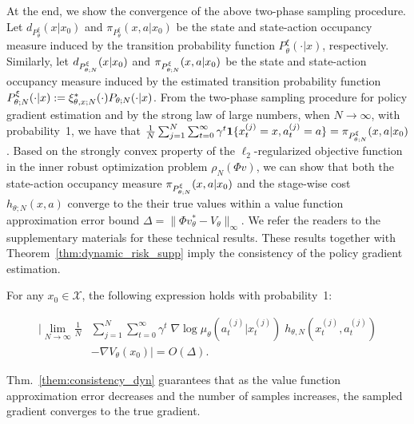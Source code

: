 At the end, we show the convergence of the above two-phase sampling procedure.
Let $d_{{P}^\xi_{\theta}}(x|x_0)$ and $\pi_{{P}^\xi_{\theta}}(x,a|x_0)$ be the state and state-action occupancy measure induced by the transition probability function $P^\xi_{\theta}(\cdot|x)$, respectively. Similarly, let $d_{P_{\theta;N}^\xi}(x|x_0)$ and $\pi_{P_{\theta;N}^\xi}(x,a|x_0)$ be the state and state-action occupancy measure induced by the estimated transition probability function $P_{\theta;N}^\xi(\cdot|x):=\xi_{\theta,x;N}^*(\cdot)P_{\theta;N}(\cdot|x)$. From the two-phase sampling procedure for policy gradient estimation and by the strong law of large numbers, when $N\rightarrow\infty$, with probability~1, we have that $\frac{1}{N}\sum_{j=1}^N\sum_{t=0}^\infty\gamma^t\mathbf 1\{x^{(j)}_t=x,a^{(j)}_t=a\}=\pi_{P_{\theta;N}^\xi}(x,a|x_0)$. Based on the strongly convex property of the $\ell_2$-regularized objective function in the inner robust optimization problem $\rho_N(\Phi v)$, we can show that both the state-action occupancy measure $\pi_{P_{\theta;N}^\xi}(x,a|x_0)$ and the stage-wise cost ${h}_{\theta;N}(x,a)$ converge to the their true values within a value function approximation error bound $\Delta=\|\Phi v^*_\theta-V_\theta\|_\infty$. We refer the readers to the supplementary materials for these technical results. These results together with Theorem~\ref{thm:dynamic_risk_supp} imply the consistency of the policy gradient estimation.
%
\begin{theorem}\label{them:consistency_dyn}
For any $x_0\in\mathcal X$, the following expression holds with probability~1:

\vspace{-0.2in}
\begin{small}
\begin{align*}
\bigg|\lim_{N\rightarrow\infty}\frac{1}{N}&\sum_{j=1}^N\sum_{t=0}^\infty\gamma^t\;\nabla\log\mu_\theta(a^{(j)}_t|x^{(j)}_t)\;h_{\theta,N}(x^{(j)}_t,a^{(j)}_t)\\
&-\nabla V_\theta(x_0)\bigg |=O(\Delta).
\end{align*}
\end{small}
\vspace{-0.2in}

\end{theorem}
\vspace{-5pt}
Thm.~\ref{them:consistency_dyn} guarantees that as the value function approximation error decreases and the number of samples increases, the sampled gradient converges to the true gradient.

